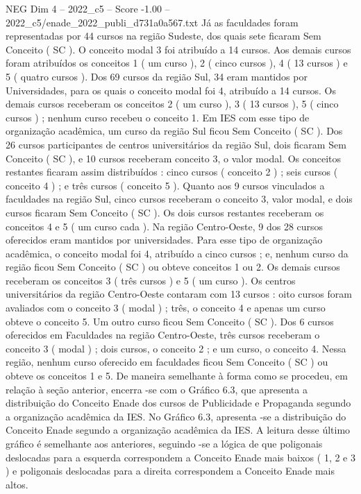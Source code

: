 \begin{textsample}{NEG Dim 4 – 2022\_c5 – Score -1.00 – 2022\_c5/enade\_2022\_publi\_d731a0a567.txt}
Já as faculdades foram representadas por 44 cursos na região Sudeste, dos quais sete ficaram Sem Conceito ( SC ).
O conceito modal 3 foi atribuído a 14 cursos.
Aos demais cursos foram atribuídos os conceitos 1 ( um curso ), 2 ( cinco cursos ), 4 ( 13 cursos ) e 5 ( quatro cursos ).
Dos 69 cursos da região Sul, 34 eram mantidos por Universidades, para os quais o conceito modal foi 4, atribuído a 14 cursos.
Os demais cursos receberam os conceitos 2 ( um curso ), 3 ( 13 cursos ), 5 ( cinco cursos ) ; nenhum curso recebeu o conceito 1.
Em IES com esse tipo de organização acadêmica, um curso da região Sul ficou Sem Conceito ( SC ).
Dos 26 cursos participantes de centros universitários da região Sul, dois ficaram Sem Conceito ( SC ), e 10 cursos receberam conceito 3, o valor modal.
Os conceitos restantes ficaram assim distribuídos : cinco cursos ( conceito 2 ) ; seis cursos ( conceito 4 ) ; e três cursos ( conceito 5 ).
Quanto aos 9 cursos vinculados a faculdades na região Sul, cinco cursos receberam o conceito 3, valor modal, e dois cursos ficaram Sem Conceito ( SC ).
Os dois cursos restantes receberam os conceitos 4 e 5 ( um curso cada ).
Na região Centro-Oeste, 9 dos 28 cursos oferecidos eram mantidos por universidades.
Para esse tipo de organização acadêmica, o conceito modal foi 4, atribuído a cinco cursos ; e, nenhum curso da região ficou Sem Conceito ( SC ) ou obteve conceitos 1 ou 2.
Os demais cursos receberam os conceitos 3 ( três cursos ) e 5 ( um curso ).
Os centros universitários da região Centro-Oeste contaram com 13 cursos : oito cursos foram avaliados com o conceito 3 ( modal ) ; três, o conceito 4 e apenas um curso obteve o conceito 5.
Um outro curso ficou Sem Conceito ( SC ).
Dos 6 cursos oferecidos em Faculdades na região Centro-Oeste, três cursos receberam o conceito 3 ( modal ) ; dois cursos, o conceito 2 ; e um curso, o conceito 4.
Nessa região, nenhum curso oferecido em faculdades ficou Sem Conceito ( SC ) ou obteve os conceitos 1 e 5.
De maneira semelhante à forma como se procedeu, em relação à seção anterior, encerra -se com o Gráfico 6.3, que apresenta a distribuição do Conceito Enade dos cursos de Publicidade e Propaganda segundo a organização acadêmica da IES.
No Gráfico 6.3, apresenta -se a distribuição do Conceito Enade segundo a organização acadêmica da IES.
A leitura desse último gráfico é semelhante aos anteriores, seguindo -se a lógica de que poligonais deslocadas para a esquerda correspondem a Conceito Enade mais baixos ( 1, 2 e 3 ) e poligonais deslocadas para a direita correspondem a Conceito Enade mais altos.

\end{textsample}
